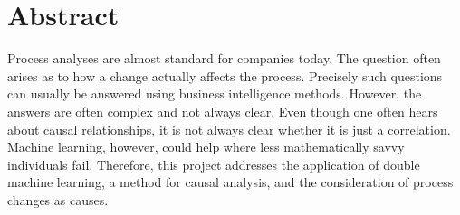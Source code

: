 \chapter*{Abstract}
Process analyses are almost standard for companies today. The question often arises as to how a change actually affects the process. Precisely such questions can usually be answered using business intelligence methods. However, the answers are often complex and not always clear. Even though one often hears about causal relationships, it is not always clear whether it is just a correlation. Machine learning, however, could help where less mathematically savvy individuals fail. Therefore, this project addresses the application of double machine learning, a method for causal analysis, and the consideration of process changes as causes.
\clearpage

\ohead{\pagemark}

\tableofcontents

\listoffigures
{}
\clearpage